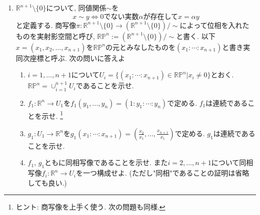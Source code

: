 \documentclass[dvipdfmx,a4paper,11pt]{article}
\newcommand{\R}{\mathbb{R}}
\theoremstyle{definition}
\begin{document}
\begin{enumerate}[ label=\textbf{問}\ref*{sec-quot}.\arabic*]
\item \label{realproj}$\R^{n+1} \setminus \{ 0\}$について, 同値関係$\sim$を
	$$
	x \sim y \Leftrightarrow \text{0でない実数$\alpha$が存在して$x = \alpha y$}
	$$
	と定義する. 商写像$\pi : \R^{n+1} \setminus \{ 0\} \rightarrow (\R^{n+1} \setminus \{ 0\})/\sim$によって位相を入れたものを実射影空間と呼び, $ \R\mathbb{P}^{n}:= (\R^{n+1} \setminus \{ 0\})/\sim$と書く.  以下$x= (x_{1}, x_{2}, \ldots, x_{n+1})$を$\R\mathbb{P}^{n}$の元とみなしたものを$(x_{1}: \cdots : x_{n+1})$と書き実同次座標と呼ぶ. 
次の問いに答えよ
	\begin{enumerate}
		\setlength{\parskip}{0cm} 
  \setlength{\itemsep}{0pt} 
	\item $i=1,\ldots, n+1$について$U_{i} = \{(x_{1}: \cdots : x_{n+1}) \in \R\mathbb{P}^{n} | x_i \neq 0\}$とおく. $\R\mathbb{P}^{n} = \cup_{i=1}^{n+1}U_i$であることを示せ.
\item $f_1 : \R^{n} \rightarrow U_1$を$f_1(y_1, \ldots,y_{n})=(1:y_1:\cdots : y_{n} )$で定める. $f_1$は連続であることを示せ. \footnote{ヒント: 商写像を上手く使う. 次の問題も同様.}
\item $g_1: U_1 \to \R^n$を$g_1(x_{1}: \cdots : x_{n+1}) =(\frac{x_2}{x_1}, \ldots, \frac{x_{n+1}}{x_1})$で定める. $g_1$は連続であることを示せ. 
\item $f_1$, $g_1$ともに同相写像であることを示せ. また$i=2,\ldots, n+1$について同相写像$f_i :  \R^n \to U_i$を一つ構成せよ. (ただし"同相"であることの証明は省略しても良い.)
	\end{enumerate}


\end{enumerate}
\end{document}
